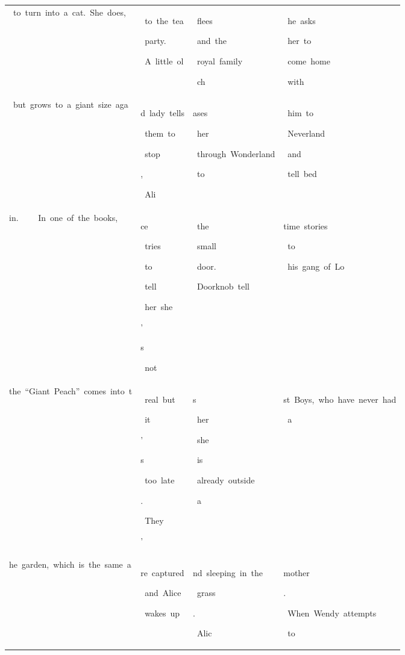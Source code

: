 \begin{table}[h]
\begin{tabular}{ l  l  l  l}
 \ to\ turn\ into\ a\ cat.\ She\ does, & \colorbox{cm_12!40}{\strut \ to\ the\ tea}\colorbox{cm_25!40}{\strut \ party.}\colorbox{cm_0!40}{\strut \ A\ little\ ol} & \colorbox{cm_0!40}{\strut \ flees}\colorbox{cm_12!40}{\strut \ and\ the}\colorbox{cm_0!40}{\strut \ royal\ family}\colorbox{cm_12!40}{\strut \ ch} & \colorbox{cm_0!40}{\strut \ he\ asks}\colorbox{cm_12!40}{\strut \ her\ to}\colorbox{cm_0!40}{\strut \ come\ home}\colorbox{cm_12!40}{\strut \ with} \\ 
 \ but\ grows\ to\ a\ giant\ size\ aga & \colorbox{cm_0!40}{\strut d\ lady\ tells}\colorbox{cm_12!40}{\strut \ them\ to}\colorbox{cm_0!40}{\strut \ stop}\colorbox{cm_12!40}{\strut ,}\colorbox{cm_25!40}{\strut \ Ali} & \colorbox{cm_25!40}{\strut ases}\colorbox{cm_38!40}{\strut \ her}\colorbox{cm_0!40}{\strut \ through\ Wonderland}\colorbox{cm_12!40}{\strut \ to} & \colorbox{cm_12!40}{\strut \ him\ to}\colorbox{cm_0!40}{\strut \ Neverland}\colorbox{cm_12!40}{\strut \ and}\colorbox{cm_0!40}{\strut \ tell\ bed} \\ 
 in.  \ \ \ \ In\ one\ of\ the\ books,\  & \colorbox{cm_25!40}{\strut ce}\colorbox{cm_0!40}{\strut \ tries}\colorbox{cm_12!40}{\strut \ to}\colorbox{cm_0!40}{\strut \ tell}\colorbox{cm_12!40}{\strut \ her\ she}\colorbox{cm_0!40}{\strut '}\colorbox{cm_12!40}{\strut s}\colorbox{cm_0!40}{\strut \ not} & \colorbox{cm_12!40}{\strut \ the}\colorbox{cm_0!40}{\strut \ small}\colorbox{cm_12!40}{\strut \ door.}\colorbox{cm_0!40}{\strut \ Doorknob\ tell} & \colorbox{cm_0!40}{\strut time\ stories}\colorbox{cm_12!40}{\strut \ to}\colorbox{cm_0!40}{\strut \ his\ gang\ of\ Lo} \\ 
 the\ “Giant\ Peach”\ comes\ into\ t & \colorbox{cm_0!40}{\strut \ real\ but}\colorbox{cm_12!40}{\strut \ it}\colorbox{cm_0!40}{\strut '}\colorbox{cm_12!40}{\strut s}\colorbox{cm_0!40}{\strut \ too\ late}\colorbox{cm_12!40}{\strut .}\colorbox{cm_25!40}{\strut \ They}\colorbox{cm_0!40}{\strut '} & \colorbox{cm_0!40}{\strut s}\colorbox{cm_12!40}{\strut \ her}\colorbox{cm_0!40}{\strut \ she}\colorbox{cm_12!40}{\strut \ is}\colorbox{cm_0!40}{\strut \ already\ outside}\colorbox{cm_12!40}{\strut \ a} & \colorbox{cm_0!40}{\strut st\ Boys,\ who\ have\ never\ had}\colorbox{cm_12!40}{\strut \ a}\colorbox{cm_0!40}{\strut \ } \\ 
 he\ garden,\ which\ is\ the\ same\ a & \colorbox{cm_0!40}{\strut re\ captured}\colorbox{cm_12!40}{\strut \ and\ Alice}\colorbox{cm_0!40}{\strut \ wakes\ up} & \colorbox{cm_12!40}{\strut nd\ sleeping\ in\ the}\colorbox{cm_0!40}{\strut \ grass}\colorbox{cm_12!40}{\strut .}\colorbox{cm_25!40}{\strut \ Alic} & \colorbox{cm_0!40}{\strut mother}\colorbox{cm_12!40}{\strut .}\colorbox{cm_0!40}{\strut \ When\ Wendy\ attempts}\colorbox{cm_12!40}{\strut \ to} \\ 

\end{tabular}
\end{table}
